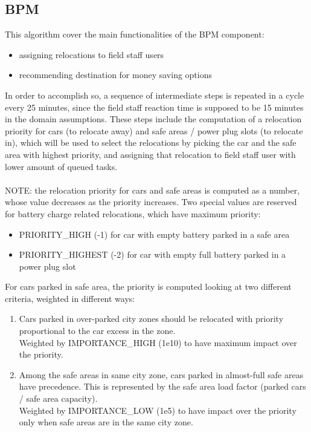 \documentclass[english]{article}
\begin{document}
	\subsection{BPM}
		This algorithm cover the main functionalities of the BPM component:
		\begin{itemize}
			\item assigning relocations to field staff users
			\item recommending destination for money saving options
		\end{itemize}
		In order to accomplish so, a sequence of intermediate steps is repeated in a cycle every 25 minutes, since the field staff reaction time is supposed to be 15 minutes in the domain assumptions.
		These steps include the computation of a relocation priority for cars (to relocate away) and safe areas / power plug slots (to relocate in), which will be used to select the relocations by picking the car and the safe area with highest priority, and assigning that relocation to field staff user with lower amount of queued tasks.\\\\
		NOTE: the relocation priority for cars and safe areas is computed as a number, whose value decreases as the priority increases.
		Two special values are reserved for battery charge related relocations, which have maximum priority:
		\begin{itemize}
			\item{ PRIORITY\_HIGH 	     (-1) 	for car with empty battery parked in a safe area }
			\item{ PRIORITY\_HIGHEST (-2) 	for car with empty full battery parked in a power plug slot }
		\end{itemize}
		For cars parked in safe area, the priority is computed looking at two different criteria,  weighted in different ways:
		\begin{enumerate}
			\item{ Cars parked in over-parked city zones should be relocated with priority proportional to the car excess in the zone. \\
					Weighted by IMPORTANCE\_HIGH (1e10) to have maximum impact over the priority. }
			\item{ Among the safe areas in same city zone, cars parked in almost-full safe areas have precedence. This is represented by the safe area load factor (parked cars / safe area capacity). \\ 
			Weighted by IMPORTANCE\_LOW (1e5) to have impact over the priority only when safe areas are in the same city zone. }
		\end{enumerate}
\end{document}
